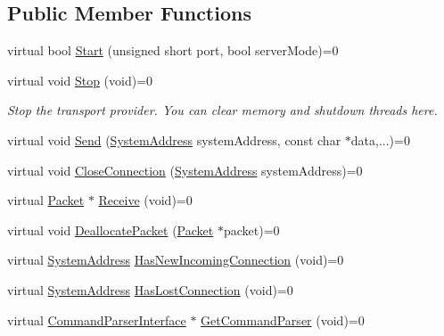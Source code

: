 \subsection*{Public Member Functions}
\begin{DoxyCompactItemize}
\item 
virtual bool \hyperlink{class_rak_net_1_1_transport_interface_a309a38aa455b6b72f1c760276f3fb6a8}{Start} (unsigned short port, bool server\-Mode)=0
\item 
\hypertarget{class_rak_net_1_1_transport_interface_a71861ee293181ff1f313a52c8bd448e8}{virtual void \hyperlink{class_rak_net_1_1_transport_interface_a71861ee293181ff1f313a52c8bd448e8}{Stop} (void)=0}\label{class_rak_net_1_1_transport_interface_a71861ee293181ff1f313a52c8bd448e8}

\begin{DoxyCompactList}\small\item\em Stop the transport provider. You can clear memory and shutdown threads here. \end{DoxyCompactList}\item 
virtual void \hyperlink{class_rak_net_1_1_transport_interface_ab77f9c90719f38340bdbcb4ffdbf192a}{Send} (\hyperlink{struct_rak_net_1_1_system_address}{System\-Address} system\-Address, const char $\ast$data,...)=0
\item 
virtual void \hyperlink{class_rak_net_1_1_transport_interface_a089cdab96f00d399988c3a23db039201}{Close\-Connection} (\hyperlink{struct_rak_net_1_1_system_address}{System\-Address} system\-Address)=0
\item 
virtual \hyperlink{struct_rak_net_1_1_packet}{Packet} $\ast$ \hyperlink{class_rak_net_1_1_transport_interface_a2d458e6e575f700f292c42b7566d15c9}{Receive} (void)=0
\item 
virtual void \hyperlink{class_rak_net_1_1_transport_interface_a889932d752ad7a3e14108cd0b5371b7a}{Deallocate\-Packet} (\hyperlink{struct_rak_net_1_1_packet}{Packet} $\ast$packet)=0
\item 
virtual \hyperlink{struct_rak_net_1_1_system_address}{System\-Address} \hyperlink{class_rak_net_1_1_transport_interface_a78f3977421deabf57046773112d07626}{Has\-New\-Incoming\-Connection} (void)=0
\item 
virtual \hyperlink{struct_rak_net_1_1_system_address}{System\-Address} \hyperlink{class_rak_net_1_1_transport_interface_a7ee1400724af8c3d94555c4c5ca189c5}{Has\-Lost\-Connection} (void)=0
\item 
virtual \hyperlink{class_rak_net_1_1_command_parser_interface}{Command\-Parser\-Interface} $\ast$ \hyperlink{class_rak_net_1_1_transport_interface_ad96ea3ff016ad1a7590e1f63d5efd6b0}{Get\-Command\-Parser} (void)=0
\end{DoxyCompactItemize}



